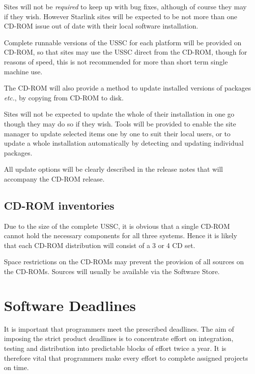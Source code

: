 \documentclass[twoside,11pt]{article}
\newcommand{\xlabel}[1]{}
\begin{document}
Sites will not be \emph{required}\/ to keep up with bug fixes, although
of course they may if they wish.  However Starlink sites will be
expected to be not more than one CD-ROM issue out of date with their
local software installation.

Complete runnable versions of the USSC for each platform will be
provided on CD-ROM, so that sites may use the USSC direct from the
CD-ROM, though for reasons of speed, this is not recommended for more than 
short term single machine use.

The CD-ROM will also provide a method to update installed versions of
packages \emph{etc.}, by copying from CD-ROM to disk.

Sites will not be expected to update the whole of their installation in
one go though they may do so if they wish.  Tools will be provided to
enable the site manager to update selected items one by one to suit
their local users, or to update a whole installation automatically by
detecting and updating individual packages.

All update options will be clearly described in the release notes that
will accompany the CD-ROM release.

\subsection{\label{cdrom_inventories}\xlabel{cdrom_inventories}CD-ROM inventories}

Due to the size of the complete USSC, it is obvious that a single CD-ROM
cannot hold the necessary components for all three systems.  Hence it is
likely that each CD-ROM distribution will consist of a 3 or 4 CD set.

Space restrictions on the CD-ROMs may prevent the provision of all
sources on the CD-ROMs.  Sources will usually be available via the
Software Store.

\section{\label{software_deadlines}\xlabel{software_deadlines}Software Deadlines}

It is important that programmers meet the prescribed deadlines.  The aim
of imposing the strict product deadlines is to concentrate effort on
integration, testing and distribution into predictable blocks of effort
twice a year.  It is therefore vital that programmers make every effort to
complete assigned projects on time. 
\end{document}
